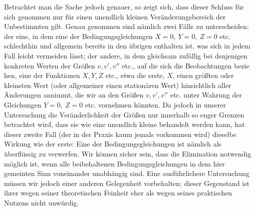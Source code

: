Betrachtet man die Sache jedoch genauer, so zeigt sich, dass dieser Schluss für sich genommen nur für einen unendlich kleinen Veränderungsbereich der Unbestimmten gilt. Genau genommen sind nämlich zwei Fälle zu unterscheiden: der eine, in dem eine der Bedingungsgleichungen \(X=0,\ Y=0,\ Z=0\) etc. schlechthin und allgemein bereits in den übrigen enthalten ist, was sich in jedem Fall leicht vermeiden lässt; der andere, in dem gleichsam zufällig bei denjenigen konkreten Werten der Größen \(v,v',v''\) etc., auf die sich die Beobachtungen bezie%
hen, eine der Funktionen \(X,Y,Z\) etc., etwa die erste, \(X\), einen größten oder kleinsten Wert (oder allgemeiner einen stationären Wert) hinsichtlich aller Änderungen annimmt, die wir an den Größen \(v,v',v''\) etc. unter Wahrung der Gleichungen \(Y=0,\ Z=0\) etc. vornehmen könnten. Da jedoch in unserer Untersuchung die Veränderlichkeit der Größen nur innerhalb so enger Grenzen betrachtet wird, dass sie wie eine unendlich kleine behandelt werden kann, hat dieser zweite Fall (der in der Praxis kaum jemals vorkommen wird) dieselbe Wirkung wie der erste: Eine der Bedingungsgleichungen ist nämlich als überflüssig zu verwerfen. Wir können sicher sein, dass die Elimination notwendig möglich ist, wenn alle beibehaltenen Bedingungsgleichungen in dem hier gemeinten Sinn voneinander unabhängig sind. Eine ausführlichere Untersuchung müssen wir jedoch einer anderen Gelegenheit vorbehalten; dieser Gegenstand ist ihrer wegen seiner theoretischen Feinheit eher als wegen seines praktischen Nutzens nicht unwürdig.

\clearpage
